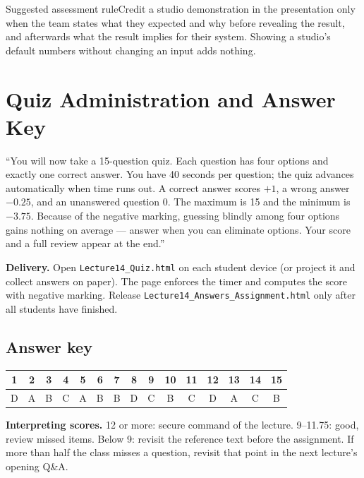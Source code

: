 \documentclass[11pt]{article}
\begin{document}
\begin{instr}{Suggested assessment rule}Credit a studio demonstration in the presentation only when the team states what they expected and why before revealing the result, and afterwards what the result implies for their system. Showing a studio's default numbers without changing an input adds nothing.\end{instr}

\section{Quiz Administration and Answer Key}

\begin{sayit}``You will now take a 15-question quiz. Each question has four options and exactly one correct answer. You have 40 seconds per question; the quiz advances automatically when time runs out. A correct answer scores $+1$, a wrong answer $-0.25$, and an unanswered question 0. The maximum is 15 and the minimum is $-3.75$. Because of the negative marking, guessing blindly among four options gains nothing on average --- answer when you can eliminate options. Your score and a full review appear at the end.''\end{sayit}

\textbf{Delivery.} Open \texttt{Lecture14\_Quiz.html} on each student device (or project it and collect answers on paper). The page enforces the timer and computes the score with negative marking. Release \texttt{Lecture14\_Answers\_Assignment.html} only after all students have finished.

\subsection*{Answer key}\begin{center}\small\renewcommand{\arraystretch}{1.3}\begin{tabular}{|c|c|c|c|c|c|c|c|c|c|c|c|c|c|c|}\hline \textbf{1} & \textbf{2} & \textbf{3} & \textbf{4} & \textbf{5} & \textbf{6} & \textbf{7} & \textbf{8} & \textbf{9} & \textbf{10} & \textbf{11} & \textbf{12} & \textbf{13} & \textbf{14} & \textbf{15}\\\hline D & A & B & C & A & B & B & D & C & B & C & D & A & C & B\\\hline\end{tabular}\end{center}

\textbf{Interpreting scores.} 12 or more: secure command of the lecture. 9--11.75: good, review missed items. Below 9: revisit the reference text before the assignment. If more than half the class misses a question, revisit that point in the next lecture's opening Q\&A.
\end{document}
